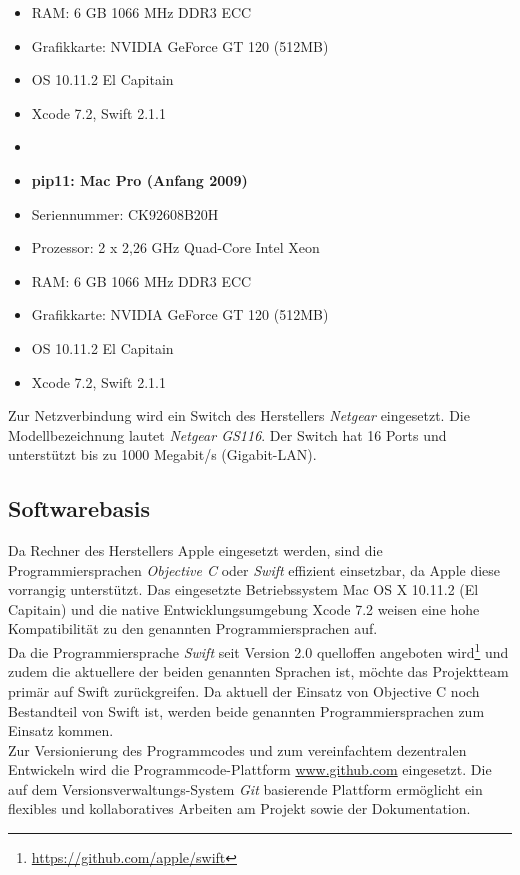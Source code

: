 \begin{itemize}
	\item[] RAM: 6 GB 1066 MHz DDR3 ECC
	\item[] Grafikkarte: NVIDIA GeForce GT 120 (512MB)
	\item[] OS 10.11.2 El Capitain
	\item[] Xcode 7.2, Swift 2.1.1
	\item[] 
	\item\textbf{pip11: Mac Pro (Anfang 2009)}
	\item[] Seriennummer: CK92608B20H
	\item[] Prozessor: 2 x 2,26 GHz Quad-Core Intel Xeon 
	\item[] RAM: 6 GB 1066 MHz DDR3 ECC
	\item[] Grafikkarte: NVIDIA GeForce GT 120 (512MB)
	\item[] OS 10.11.2 El Capitain
	\item[] Xcode 7.2, Swift 2.1.1
\end{itemize}

Zur Netzverbindung wird ein Switch des Herstellers \emph{Netgear} eingesetzt. Die Modellbezeichnung lautet \emph{Netgear GS116}. Der Switch hat 16 Ports und unterstützt bis zu 1000 Megabit/s (Gigabit-LAN).

\subsection{Softwarebasis}
\label{softwarebasis}
Da Rechner des Herstellers Apple eingesetzt werden, sind die Programmiersprachen \emph{Objective C} oder \emph{Swift} effizient einsetzbar, da Apple diese vorrangig unterstützt. Das eingesetzte Betriebssystem Mac OS X 10.11.2 (El Capitain) und die native Entwicklungsumgebung Xcode 7.2 weisen eine hohe Kompatibilität zu den genannten Programmiersprachen auf. \\
Da die Programmiersprache \emph{Swift} seit Version 2.0 quelloffen angeboten wird\footnote{\url{https://github.com/apple/swift}} und zudem die aktuellere der beiden genannten Sprachen ist, möchte das Projektteam primär auf Swift zurückgreifen. Da aktuell der Einsatz von Objective C noch Bestandteil von Swift ist, werden beide genannten Programmiersprachen zum Einsatz kommen. \\

Zur Versionierung des Programmcodes und zum vereinfachtem dezentralen Entwickeln wird die Programmcode-Plattform \url{www.github.com} eingesetzt. Die auf dem Versionsverwaltungs-System \emph{Git} basierende Plattform ermöglicht ein flexibles und kollaboratives Arbeiten am Projekt sowie der Dokumentation. \\

